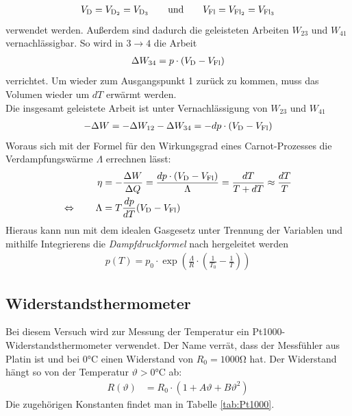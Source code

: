 \documentclass[12pt,a4paper,titlepage,headinclude,bibtotoc]{scrartcl}
\begin{document}
\begin{align*}
V_\text D = V_{\text{D}_2}= V_{\text{D}_3}\qquad\text{und}\qquad V_\text{Fl}=V_{\text{Fl}_2}=V_{\text{Fl}_3}
\end{align*}
verwendet werden.
Außerdem sind dadurch die geleisteten Arbeiten $W_{23}$ und $W_{41}$ vernachlässigbar.
So wird in $3\rightarrow 4$ die Arbeit
\begin{align*}
\Delta W_{34}=p\cdot (V_\text D-V_\text{Fl})
\end{align*}
verrichtet.
Um wieder zum Ausgangspunkt 1 zurück zu kommen, muss das Volumen wieder um $dT$ erwärmt werden.\\
Die insgesamt geleistete Arbeit ist unter Vernachlässigung von $W_{23}$ und $W_{41}$
\begin{align*}
-\Delta W=-\Delta W_{12}-\Delta W_{34}=-dp\cdot (V_\text D -V_\text{Fl})
\end{align*}
Woraus sich mit der Formel für den Wirkungsgrad eines Carnot-Prozesses die Verdampfungswärme $\Lambda$ errechnen lässt:
\begin{align*}
\eta&=-\frac{\Delta W}{\Delta Q}=\frac{dp\cdot (V_\text D-V_\text{Fl})}{\Lambda}=\frac{dT}{T+dT}\approx \frac{dT}{T}\\
\Leftrightarrow\qquad \Lambda&=T\frac{dp}{dT}(V_\text D-V_\text{Fl})
\end{align*}
Hieraus kann nun mit dem idealen Gasgesetz unter Trennung der Variablen und mithilfe Integrierens die \emph{Dampfdruckformel} nach \cite[S. 342, Formel (10.127)]{demtroeder} hergeleitet werden
\begin{align}
p(T)=p_0\cdot \exp\left( \frac{\Lambda}{R}\cdot\left( \frac{1}{T_0}-\frac{1}{T} \right)\right)
\label{eq:Dampfdruck}
\end{align}



\subsection{Widerstandsthermometer}

Bei diesem Versuch wird zur Messung der Temperatur ein Pt1000-Widerstandsthermometer verwendet.
Der Name verrät, dass der Messfühler aus Platin ist und bei $0\si{\celsius}$ einen Widerstand von $R_0=1000\si{\ohm}$ hat.
Der Widerstand hängt so von der Temperatur $\vartheta>0\si{\celsius}$ ab:
\begin{align}
R(\vartheta)&=R_0\cdot\left(1 + A\vartheta + B\vartheta^2\right) \label{eq:Pt1000}
\end{align}
Die zugehörigen Konstanten findet man in Tabelle \ref{tab:Pt1000}.
\end{document}
